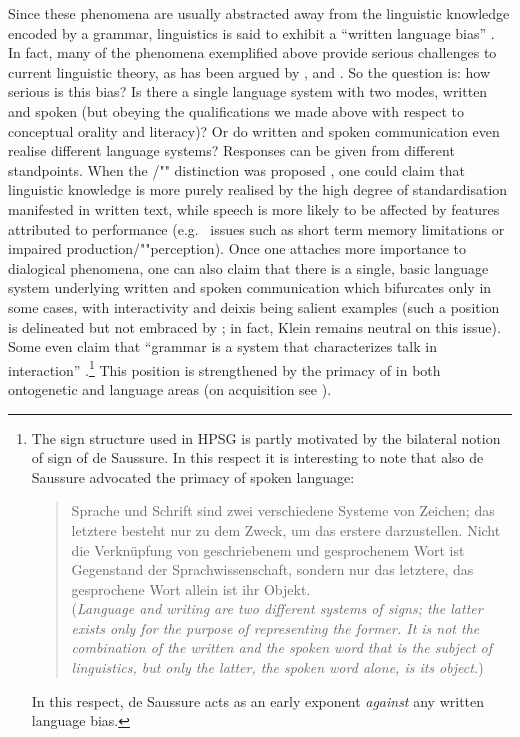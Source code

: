 \documentclass[output=paper
	        ,collection
	        ,collectionchapter
 	        ,biblatex
                ,babelshorthands
                ,newtxmath
                ,draftmode
                ,colorlinks, citecolor=brown
]{langscibook}
\begin{document}
Since these phenomena are usually abstracted away from the linguistic knowledge encoded by a grammar, linguistics is said to exhibit a \enquote{written language bias}  \citep{Linell:2005}.
%
In fact, many of the phenomena exemplified above provide serious challenges  to current  linguistic theory, as has been argued by \citet{Ginzburg:2012}, \citet{Ginzburg:Poesio:2016} and \citet{Kempson:Cann:Gregoromichelaki:Chatzikyriakidis:2016}.
%
So the question is: how serious is this bias? 
%
Is there a single language system with two modes, written and spoken (but obeying the qualifications we made above with respect to conceptual orality and literacy)?
%
Or do written and spoken communication even realise different language systems?
%
Responses can be given from different standpoints. 
%
When the /""  distinction was proposed \citep{Chomsky:1969}, one could claim that linguistic knowledge is more purely realised by the high degree of standardisation manifested in written text, while speech is more likely to be affected by features attributed to performance (e.g.\   issues such as short term memory limitations or impaired production/""perception).
%
Once one attaches more importance to dialogical phenomena, one can also claim that there is a single, basic language system underlying written and spoken communication which bifurcates only in some cases, with interactivity and deixis being salient examples (such a position is delineated but not embraced by \citealt{Klein:1985}; in fact, Klein remains neutral on this issue). 
%
Some even claim that \enquote{grammar is a system that characterizes talk in interaction} \citep[]{Ginzburg:Poesio:2016}.\footnote{The sign structure used in HPSG is partly motivated by the bilateral notion of sign of de Saussure. In this respect it is interesting to note that also de Saussure advocated the primacy of spoken language:
\begin{quote}
    Sprache und Schrift sind zwei verschiedene Systeme von Zeichen; das letztere besteht nur zu dem Zweck, um das erstere darzustellen. Nicht die Verknüpfung von geschriebenem und gesprochenem Wort ist Gegenstand der Sprachwissenschaft, sondern nur das letztere, das gesprochene Wort allein ist ihr Objekt. \citep[]{de:Saussure:2001:DE} \\
    (\textit{Language and writing are two different systems of signs; the latter exists only for the purpose of representing the former. It is not the combination of the written and the spoken word that is the subject of linguistics, but only the latter, the spoken word alone, is its object.})
\end{quote}
In this respect, de Saussure acts as an early exponent \emph{against} any written language bias.
}
%
This position is strengthened by the primacy of  in both ontogenetic and language  areas (on acquisition see ).
\end{document}
